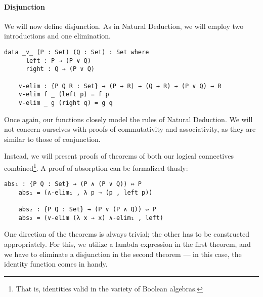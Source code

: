 \documentclass[12pt]{article}
\begin{document}
\paragraph{Disjunction}
We will now define disjunction. As in Natural Deduction, we will employ two introductions and one elimination.
\begin{Verbatim}[samepage=true]
    data _∨_ (P : Set) (Q : Set) : Set where
      left : P → (P ∨ Q)
      right : Q → (P ∨ Q)

    ∨-elim : {P Q R : Set} → (P → R) → (Q → R) → (P ∨ Q) → R
    ∨-elim f _ (left p) = f p
    ∨-elim _ g (right q) = g q
\end{Verbatim}
Once again, our functions closely model the rules of Natural Deduction. We will not concern ourselves with proofs of commutativity and associativity, as they are similar to those of conjunction.

Instead, we will present proofs of theorems of both our logical connectives combined\footnote{That is, identities valid in the variety of Boolean algebras.}. A proof of absorption can be formalized thusly:
\begin{Verbatim}[samepage=true]
    abs₁ : {P Q : Set} → (P ∧ (P ∨ Q)) ⇔ P
    abs₁ = (∧-elim₁ , λ p → (p , left p))

    abs₂ : {P Q : Set} → (P ∨ (P ∧ Q)) ⇔ P
    abs₂ = (∨-elim (λ x → x) ∧-elim₁ , left)
\end{Verbatim}
One direction of the theorems is always trivial; the other has to be constructed appropriately. For this, we utilize a lambda expression in the first theorem, and we have to eliminate a disjunction in the second theorem — in this case, the identity function comes in handy.
\end{document}
